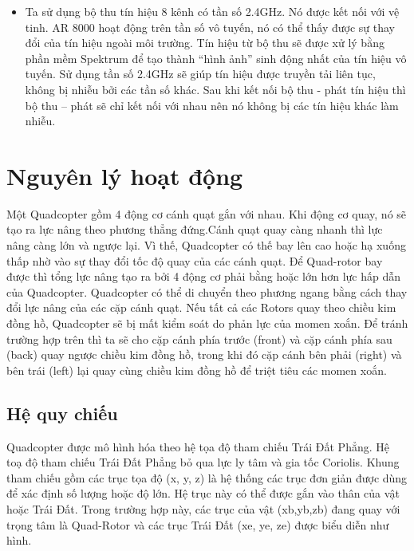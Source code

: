 \begin{itemize}
\item Ta sử dụng bộ thu tín hiệu 8 kênh có tần số 2.4GHz. Nó được kết nối với vệ tinh. AR 8000 hoạt động trên tần số vô tuyến, nó có thể thấy được sự thay đổi của tín hiệu ngoài môi trường. Tín hiệu từ bộ thu sẽ được xử lý bằng phần mềm Spektrum để tạo thành “hình ảnh” sinh động nhất của tín hiệu vô tuyến. Sử dụng tần số 2.4GHz sẽ giúp tín hiệu được truyền tải liên tục, không bị nhiễu bởi các tần số khác. Sau khi kết nối bộ thu - phát tín hiệu thì bộ thu – phát sẽ chỉ kết nối với nhau nên nó không bị các tín hiệu khác làm nhiễu.
        \end{itemize}
    \section{Nguyên lý hoạt động}
    Một Quadcopter gồm 4 động cơ cánh quạt gắn với nhau. Khi động cơ quay, nó sẽ tạo ra lực nâng theo phương thẳng đứng.Cánh quạt quay càng nhanh thì lực nâng càng lớn và ngược lại. Vì thế, Quadcopter có thế bay lên cao hoặc hạ xuống thấp nhờ vào sự thay đổi tốc độ quay của các cánh quạt. Để Quad-rotor bay được thì tổng lực nâng tạo ra bởi 4 động cơ phải bằng hoặc lớn hơn lực hấp dẫn của Quadcopter.  
    Quadcopter có thể di chuyển theo phương ngang bằng cách thay đổi lực nâng của các cặp cánh quạt.    		Nếu tất cả các Rotors quay theo chiều kim đồng hồ, Quadcopter sẽ bị mất kiểm soát do phản lực của momen xoắn. Để tránh trường hợp trên thì ta sẽ cho cặp cánh phía trước (front) và cặp cánh phía sau (back) quay ngược chiều kim đồng hồ, trong khi đó cặp cánh bên phải (right) và bên trái (left) lại quay cùng chiều kim đồng hồ để triệt tiêu các momen xoắn.   
        \subsection{Hệ quy chiếu}
Quadcopter được mô hình hóa theo hệ tọa độ tham chiếu Trái Đất Phẳng. Hệ toạ độ tham chiếu Trái Đất Phẳng bỏ qua lực ly tâm và gia tốc Coriolis.
Khung tham chiếu gồm các trục tọa độ (x, y, z) là hệ thống các trục đơn giản được dùng để xác định số lượng hoặc độ lớn. Hệ trục này có thể được gắn vào thân của vật hoặc Trái Đất. Trong trường hợp này, các trục của vật (xb,yb,zb) đang quay với trọng tâm là Quad-Rotor và các trục Trái Đất (xe, ye, ze) được biểu diễn như hình.                     
